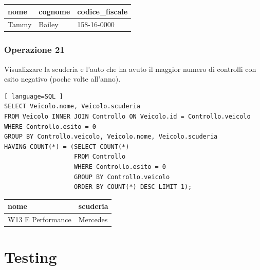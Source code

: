 \documentclass[11pt]{article}
\begin{document}
\begin{table}[!ht]
    \centering
    \begin{tabular}{|l|l|l|}
    \hline
        \textbf{nome} & \textbf{cognome} & \textbf{codice\_fiscale} \\ \hline
        Tammy & Bailey & 158-16-0000 \\ \hline
    \end{tabular}
\end{table}


\subsubsection{Operazione 21}
Visualizzare la scuderia e l'auto che ha avuto il maggior numero di controlli con esito negativo (poche volte all'anno).
\begin{lstlisting}[ language=SQL ]
SELECT Veicolo.nome, Veicolo.scuderia
FROM Veicolo INNER JOIN Controllo ON Veicolo.id = Controllo.veicolo
WHERE Controllo.esito = 0
GROUP BY Controllo.veicolo, Veicolo.nome, Veicolo.scuderia
HAVING COUNT(*) = (SELECT COUNT(*)
                   FROM Controllo
                   WHERE Controllo.esito = 0
                   GROUP BY Controllo.veicolo
                   ORDER BY COUNT(*) DESC LIMIT 1);
\end{lstlisting}

\begin{table}[!ht]
    \centering
    \begin{tabular}{|l|l|}
    \hline
        \textbf{nome} & \textbf{scuderia} \\ \hline
        W13 E Performance & Mercedes \\ \hline
    \end{tabular}
\end{table}


\section{Testing}
\end{document}
